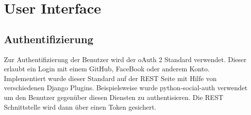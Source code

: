 

\section{User Interface}
\subsection{Authentifizierung}
Zur Authentifizierung der Benutzer wird der oAuth 2 Standard verwendet. Dieser erlaubt ein Login mit einem GitHub, FaceBook oder anderem Konto. Implementiert wurde dieser Standard auf der REST Seite mit Hilfe von verschiedenen Django Plugins. 
Beispielsweise wurde python-social-auth verwendet um den Benutzer gegenüber diesen Diensten zu authentisieren. Die REST Schnittstelle wird dann über einen Token gesichert.

